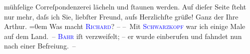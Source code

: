                     mühſelige Correſpondenzerei lächeln und ſtaunen werden.\pend
           \pstart
           {\pb}Auf dieſer Seite ſteht nur mehr, daſs ich Sie,
                    liebſter Freund, aufs Herzlichſte grüße!\pend
           \pstart
           Ganz der Ihre{\\[\baselineskip]}\spacefill\mbox{Arthur.}\pend
           \leftskip=0em{}\pstart
           \noindent{}Was macht \textcolor{blue}{\textsc{Richard}}{}\ledrightnote{\textcolor{blue}{Richard Beer-Hofmann}}? –\pend
           \pstart
           – Mit \textcolor{blue}{\textsc{Schwarzkopf}}{}\ledrightnote{\textcolor{blue}{Gustav Schwarzkopf}} war ich einige Male auf dem Land. –\pend
           \pstart
           \textcolor{blue}{\textsc{Bahr}}{}\ledrightnote{\textcolor{blue}{Hermann Bahr}} iſt verzweifelt; – er wurde einberufen und fahndet nun nach
                        einer Befreiung. –\pend
           \endnumbering{}  
      